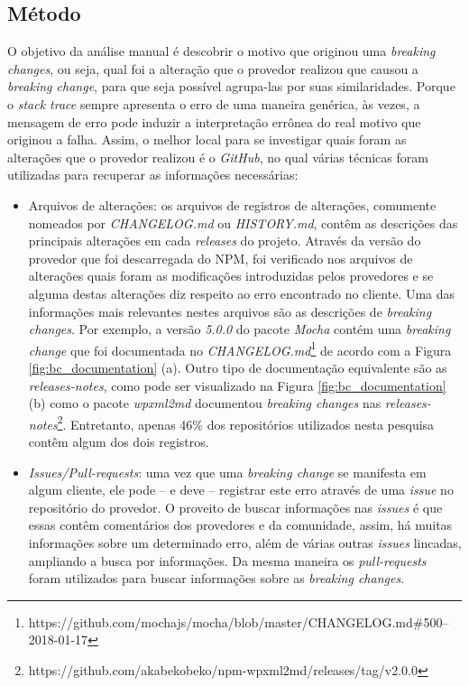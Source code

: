 \subsection{Método}
\label{apr:rq2}
O objetivo da análise manual é descobrir o motivo que originou uma \textit{breaking changes}, ou seja, qual foi a alteração que o provedor realizou que causou a \textit{breaking change}, para que seja possível agrupa-las por suas similaridades. Porque o \textit{stack trace} sempre apresenta o erro de uma maneira genérica, às vezes, a mensagem de erro pode induzir a interpretação errônea do real motivo que originou a falha. Assim, o melhor local para se investigar quais foram as alterações que o provedor realizou é o \textit{GitHub}, no qual várias técnicas foram utilizadas para recuperar as informações necessárias:

\begin{itemize}
    \item Arquivos de alterações: os arquivos de registros de alterações, comumente nomeados por \textit{CHANGELOG.md} ou \textit{HISTORY.md}, contêm as descrições das principais alterações em cada \textit{releases} do projeto. Através da versão do provedor que foi descarregada do \gls{NPM}, foi verificado nos arquivos de alterações quais foram as modificações introduzidas pelos provedores e se alguma destas alterações diz respeito ao erro encontrado no cliente. Uma das informações mais relevantes nestes arquivos são as descrições de \textit{breaking changes}. Por exemplo, a versão \textit{5.0.0} do pacote \textit{Mocha} contém uma \textit{breaking change} que foi documentada no \textit{CHANGELOG.md}\footnote{https://github.com/mochajs/mocha/blob/master/CHANGELOG.md\#500--2018-01-17} de acordo com a Figura \ref{fig:bc_documentation} (a). Outro tipo de documentação equivalente são as \textit{releases-notes}, como pode ser visualizado na Figura \ref{fig:bc_documentation} (b) como o pacote \textit{wpxml2md} documentou \textit{breaking changes} nas \textit{releases-notes}\footnote{https://github.com/akabekobeko/npm-wpxml2md/releases/tag/v2.0.0}. Entretanto, apenas 46\% dos repositórios utilizados nesta pesquisa contêm algum dos dois registros.

    \item \textit{Issues/Pull-requests}: uma vez que uma \textit{breaking change} se manifesta em algum cliente, ele pode -- e deve -- registrar este erro através de uma \textit{issue} no repositório do provedor. O proveito de buscar informações nas \textit{issues} é que essas contêm comentários dos provedores e da comunidade, assim, há muitas informações sobre um determinado erro, além de várias outras \textit{issues} lincadas, ampliando a busca por informações. Da mesma maneira os \textit{pull-requests} foram utilizados para buscar informações sobre as \textit{breaking changes}.


\end{itemize}
